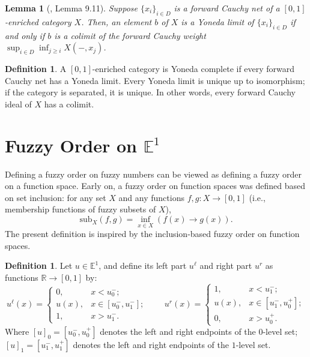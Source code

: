 \documentclass[preprint,3p,times]{elsarticle}
\theoremstyle{plain}
\newtheorem{lem}[thm]{Lemma}
\theoremstyle{definition}
\newtheorem{definition}[thm]{Definition}
\numberwithin{equation}{section}
\begin{document}
\begin{lem}[\cite{Zhang2024IntroductoryNO}, Lemma 9.11]
    Suppose $\{x_i\}_{i\in D}$ is a forward Cauchy net of a \([0,1]\)-enriched category $X$. Then, an element $b$ of $X$ is a Yoneda limit of $\{x_i\}_{i\in D}$ if and only if $b$ is a colimit of the forward Cauchy weight $\sup_{i\in D} \inf_{j\geq i} X(-,x_j)$.
\end{lem}
\begin{definition}
	A $[0,1]$-enriched category is Yoneda complete if every forward
Cauchy net has a Yoneda limit. Every Yoneda limit is unique up to
isomorphism; if the category is separated, it is unique. In other words, every forward Cauchy ideal of $X$ has a colimit.
\end{definition}
\section{Fuzzy Order on \(\mathbb{E}^1\)}
Defining a fuzzy order on fuzzy numbers can be viewed as defining a fuzzy order on a function space. Early on, a fuzzy order on function spaces was defined based on set inclusion: for any set $X$ and any
functions $f, g \colon X \to [0,1]$ (i.e., membership functions of fuzzy subsets of $X$),
\[
\text{sub}_X (f,g)=\inf_{x\in X}\left(f(x)\rightarrow g(x)\right).
\]
The present definition is inspired by the inclusion-based fuzzy order on function spaces.
\begin{definition}
    Let $u\in \mathbb{E}^1$, and define its left part \( u^\ell \) and right part \( u^r \) as functions  \( \mathbb{R} \to [0,1] \) by:
\[
u^\ell(x) =
\begin{cases}
	0, & x < u_0^-; \\
	u(x), & x \in [u_0^-, u_1^-]; \\
	1, & x > u_1^-.
\end{cases}
\qquad
u^r(x) =
\begin{cases}
	1, & x < u_1^-; \\
	u(x), & x \in [u_1^-, u_0^+]; \\
	0, & x > u_0^+.
\end{cases}
\]
Where \( [u]_0=[u^-_0, u^+_0]\)  denotes the left and right endpoints of the \(0\)-level set; \([u]_1=[u^-_1, u^+_1]\) denotes the  left and right endpoints of the \(1\)-level set.
\end{definition}
\end{document}
